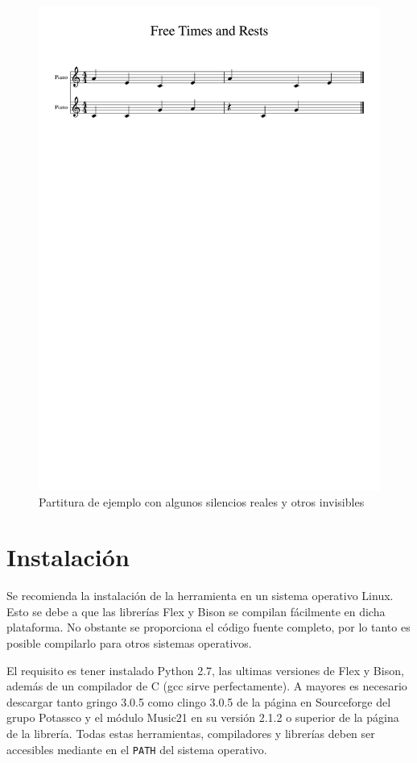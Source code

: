  \begin{figure}
 	\centering
 	\includegraphics[width=0.8\linewidth]{imagenes/scores/freetimerests.pdf}
 	\caption{Partitura de ejemplo con algunos silencios reales y otros invisibles}
 	\label{fig:rests_score}
 \end{figure}
 
\chapter{Instalación}
\label{chap:installation}
Se recomienda la instalación de la herramienta en un sistema operativo Linux. Esto se debe a que las librerías Flex y Bison se  compilan fácilmente en dicha plataforma. No obstante se proporciona el código fuente completo, por lo tanto es posible compilarlo para otros sistemas operativos.

El requisito es tener instalado Python 2.7, las ultimas versiones de Flex y Bison, además de un compilador de C (gcc sirve perfectamente). A mayores es necesario descargar tanto gringo 3.0.5 como clingo 3.0.5 de la página en Sourceforge del grupo Potassco\cite{potasscoweb} y el módulo Music21 en su versión 2.1.2 o superior de la página de la librería. Todas estas herramientas, compiladores y librerías deben ser accesibles mediante en el \texttt{PATH} del sistema operativo.

